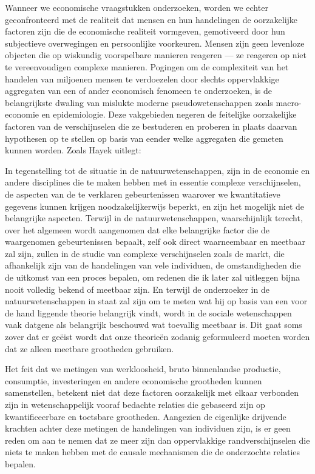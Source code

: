 Wanneer we economische vraagstukken onderzoeken, worden we echter geconfronteerd met de realiteit dat mensen en hun handelingen de oorzakelijke factoren zijn die de economische realiteit vormgeven, gemotiveerd door hun subjectieve overwegingen en persoonlijke voorkeuren. Mensen zijn geen levenloze objecten die op wiskundig voorspelbare manieren reageren --- ze reageren op niet te vereenvoudigen complexe manieren. Pogingen om de complexiteit van het handelen van miljoenen mensen te verdoezelen door slechts oppervlakkige aggregaten van een of ander economisch fenomeen te onderzoeken, is de belangrijkste dwaling van mislukte moderne pseudowetenschappen zoals macro-economie en epidemiologie. Deze vakgebieden negeren de feitelijke oorzakelijke factoren van de verschijnselen die ze bestuderen en proberen in plaats daarvan hypothesen op te stellen op basis van eender welke aggregaten die gemeten kunnen worden. Zoals Hayek uitlegt:

\begin{blockquotebox}
    In tegenstelling tot de situatie in de natuurwetenschappen, zijn in de economie en andere disciplines die te maken hebben met in essentie complexe verschijnselen, de aspecten van de te verklaren gebeurtenissen waarover we kwantitatieve gegevens kunnen krijgen noodzakelijkerwijs beperkt, en zijn het mogelijk niet de belangrijke aspecten. Terwijl in de natuurwetenschappen, waarschijnlijk terecht, over het algemeen wordt aangenomen dat elke belangrijke factor die de waargenomen gebeurtenissen bepaalt, zelf ook direct waarneembaar en meetbaar zal zijn, zullen in de studie van complexe verschijnselen zoals de markt, die afhankelijk zijn van de handelingen van vele individuen, de omstandigheden die de uitkomst van een proces bepalen, om redenen die ik later zal uitleggen bijna nooit volledig bekend of meetbaar zijn. En terwijl  de onderzoeker in de natuurwetenschappen in staat zal zijn om te meten wat hij op basis van een voor de hand liggende theorie belangrijk vindt, wordt in de sociale wetenschappen vaak datgene als belangrijk beschouwd wat toevallig meetbaar is. Dit gaat soms zover dat er geëist wordt dat onze theorieën zodanig geformuleerd moeten worden dat ze alleen meetbare grootheden gebruiken.\footnotemark
\end{blockquotebox}


Het feit dat we metingen van werkloosheid, bruto binnenlandse productie, consumptie, investeringen en andere economische grootheden kunnen samenstellen, betekent niet dat deze factoren oorzakelijk met elkaar verbonden zijn in wetenschappelijk vooraf bedachte relaties die gebaseerd zijn op kwantificeerbare en toetsbare grootheden. Aangezien de eigenlijke drijvende krachten achter deze metingen de handelingen van individuen zijn, is er geen reden om aan te nemen dat ze meer zijn dan oppervlakkige randverschijnselen die niets te maken hebben met de causale mechanismen die de onderzochte relaties bepalen.

